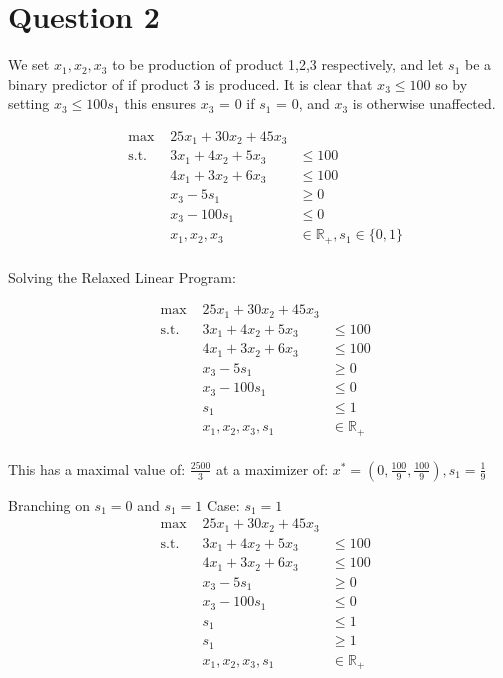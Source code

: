 \documentclass[10pt, letterpaper]{paper}
\begin{document}
\section*{Question 2}

We set $x_1,x_2,x_3$ to be production of product 1,2,3 respectively, and let $s_1$ be a binary predictor of if product 3 is produced.
It is clear that $x_3 \leq 100$ so by setting $x_3 \leq 100 s_1$ this ensures $x_3$ = 0 if $s_1$ = 0, and $x_3$ is otherwise unaffected.

\begin{equation*}
\begin{alignedat}{3}
&\text{max }&25x_1 + 30x_2 + 45x_3&\\
&\text{s.t. } &3x_1 + 4x_2 + 5x_3  &\leq 100\\
& &4x_1+3x_2+6x_3  &\leq 100\\
& &x_3 - 5s_1 &\geq 0\\
& &x_3 - 100s_1 &\leq 0\\
& &x_1, x_2, x_3& \in \mathbb{R}_+, s_1 \in \{0,1\}\\
\end{alignedat}
\end{equation*}

Solving the Relaxed Linear Program:

\begin{equation*}
\begin{alignedat}{3}
&\text{max }&25x_1 + 30x_2 + 45x_3&\\
&\text{s.t. } &3x_1 + 4x_2 + 5x_3  &\leq 100\\
& &4x_1+3x_2+6x_3  &\leq 100\\
& &x_3 - 5s_1 &\geq 0\\
& &x_3 - 100s_1 &\leq 0\\
& &s_1 &\leq 1\\
& &x_1, x_2, x_3, s_1& \in \mathbb{R}_+\\
\end{alignedat}
\end{equation*}

This has a maximal value of: $\frac{2500}{3}$ at a maximizer of: $x^* = (0,\frac{100}{9},\frac{100}{9}), s_1 = \frac{1}{9}$


Branching on $s_1 = 0$ and $s_1 = 1$
\newline
Case: $s_1 = 1$
\begin{equation*}
\begin{alignedat}{3}
&\text{max }&25x_1 + 30x_2 + 45x_3&\\
&\text{s.t. } &3x_1 + 4x_2 + 5x_3  &\leq 100\\
& &4x_1+3x_2+6x_3  &\leq 100\\
& &x_3 - 5s_1 &\geq 0\\
& &x_3 - 100s_1 &\leq 0\\
& &s_1 &\leq 1\\
& &s_1 &\geq 1\\
& &x_1, x_2, x_3, s_1& \in \mathbb{R}_+\\
\end{alignedat}
\end{equation*}
\end{document}
